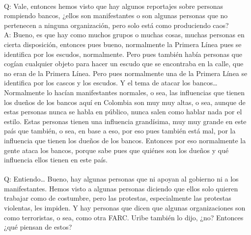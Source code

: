 \documentclass{phyasgn}\usepackage{nag}
\begin{document}
\\
Q: Vale, entonces hemos visto que hay algunos reportajes sobre personas rompiendo bancos, ¿ellos son manifestantes o son algunas personas que no pertenecen a ninguna organización, pero solo está como produciendo caos?\\
A: Bueno, es que hay como muchos grupos o muchas cosas, muchas personas en cierta disposición, entonces pues bueno, normalmente la Primera Línea pues se identifica por los escudos, normalmente. Pero pues también había personas que cogían cualquier objeto para hacer un escudo que se encontraba en la calle, que no eran de la Primera Línea. Pero pues normalmente una de la Primera Línea se identifica por los cascos y los escudos. Y el tema de atacar los bancos… Normalmente lo hacían manifestantes normales, o sea, las influencias que tienen los dueños de los bancos aquí en Colombia son muy muy altas, o sea, aunque de estas personas nunca se habla en público, nunca salen como hablar nada por el estilo. Estas personas tienen una influencia grandísima, muy muy grande en este país que también, o sea, en base a eso, por eso pues también está mal, por la influencia que tienen los dueños de los bancos. Entonces por eso normalmente la gente ataca los bancos, porque sabe pues que quiénes son los dueños y qué influencia ellos tienen en este país. \\
\\
Q: Entiendo… Bueno, hay algunas personas que ni apoyan al gobierno ni a los manifestantes. Hemos visto a algunas personas diciendo que ellos solo quieren trabajar como de costumbre, pero las protestas, especialmente las protestas violentas, les impiden. Y hay personas que dicen que algunas organizaciones son como terroristas, o sea, como otra FARC. Uribe también lo dijo, ¿no? Entonces ¿qué piensan de estos?\\
\end{document}
